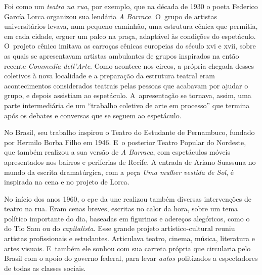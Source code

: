 Foi como um {\it teatro na rua}, por exemplo, que na década de 1930 o
poeta Federico García Lorca organizou sua lendária {\it A Barraca}. O~grupo de
artistas universitários levava, num pequeno caminhão, uma estrutura
cênica que permitia, em cada cidade, erguer um palco na praça, adaptável
às condições do espetáculo. O~projeto cênico imitava as carroças cênicas
europeias do século {\sc xvi} e {\sc xvii}, sobre as quais se apresentavam artistas
ambulantes de grupos inspirados na então recente {\it Commedia
dell'Arte}. Como acontece nos circos, a própria chegada desses coletivos
à nova localidade e a preparação da estrutura teatral eram
acontecimentos considerados teatrais pelas pessoas que acabavam por
ajudar o grupo, e depois assistiam ao espetáculo. A~apresentação se
tornava, assim, uma parte intermediária de um “trabalho coletivo de arte
em processo” que termina após os debates e conversas que se seguem ao
espetáculo.


No Brasil, seu trabalho inspirou o Teatro do Estudante de Pernambuco,
fundado por Hermilo Borba Filho em 1946. E~o posterior Teatro Popular do
Nordeste, que também realizou a sua versão de {\it A Barraca}, com
espetáculos móveis apresentados nos bairros e periferias de Recife. A
entrada de Ariano Suassuna no mundo da escrita dramatúrgica, com a peça
{\it Uma mulher vestida de Sol}, é inspirada na cena e no projeto de
Lorca.


No início dos anos 1960, o {\sc cpc} da {\sc une} realizou também diversas
intervenções de teatro na rua. Eram cenas breves, escritas no
calor da hora, sobre um tema político importante do dia, baseadas em
figurinos e adereços alegóricos, como o do Tio Sam ou do
{\it capitalista}. Esse grande projeto artístico-cultural reuniu
artistas profissionais e estudantes. Articulava teatro, cinema, música,
literatura e artes visuais. E~também ele sonhou com sua carreta própria
que circularia pelo Brasil com o apoio do governo federal, para levar
{\it autos} politizados a espectadores de todas as classes sociais.


